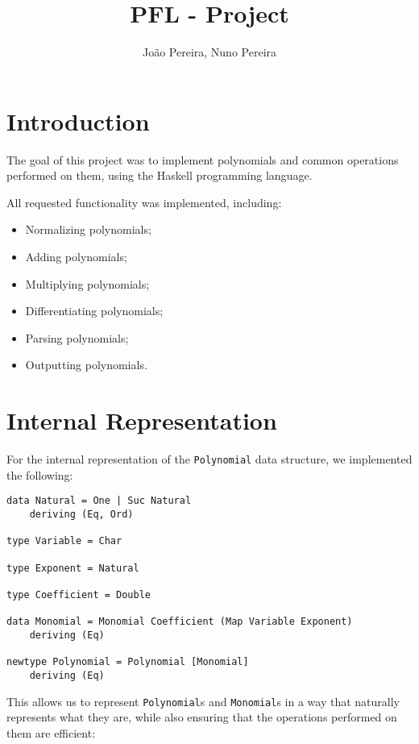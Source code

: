 \documentclass[11pt,a4paper]{article}
\title{PFL - \nth{1} Project}
\author{João Pereira, Nuno Pereira}
\begin{document}
\maketitle

\section{Introduction}

The goal of this project was to implement polynomials and common operations performed on them, using the Haskell programming language.

All requested functionality was implemented, including:

\begin{itemize}
    \item Normalizing polynomials;
    \item Adding polynomials;
    \item Multiplying polynomials;
    \item Differentiating polynomials;
    \item Parsing polynomials;
    \item Outputting polynomials.
\end{itemize}

\section{Internal Representation}

For the internal representation of the \lstinline{Polynomial} data structure, we implemented the following:

\begin{lstlisting}
data Natural = One | Suc Natural
    deriving (Eq, Ord)

type Variable = Char

type Exponent = Natural

type Coefficient = Double

data Monomial = Monomial Coefficient (Map Variable Exponent)
    deriving (Eq)

newtype Polynomial = Polynomial [Monomial]
    deriving (Eq)
\end{lstlisting}

This allows us to represent \lstinline{Polynomial}s and \lstinline{Monomial}s in a way that naturally represents what they are, while also ensuring that the operations performed on them are efficient:
\end{document}
